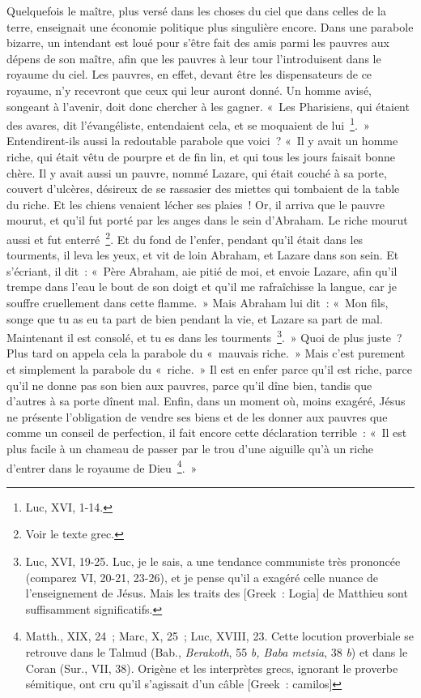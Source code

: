 \documentclass[french,twoside]{book} %
\begin{document}
Quelquefois le maître, plus versé dans les choses du ciel que dans celles de la terre, enseignait une économie politique plus singulière encore. Dans une parabole bizarre, un intendant est loué pour s’être fait des amis parmi les pauvres aux dépens de son maître, afin que les pauvres à leur tour l’introduisent dans le royaume du ciel. Les pauvres, en effet, devant être les dispensateurs de ce royaume, n’y recevront que ceux qui leur auront donné. Un homme avisé, songeant à l’avenir, doit donc chercher à les gagner. « Les Pharisiens, qui étaient des avares, dit l’évangéliste, entendaient cela, et se moquaient de lui \footnote{Luc, XVI, 1-14.}. » Entendirent-ils aussi la redoutable parabole que voici ? « Il y avait un homme riche, qui était vêtu de pourpre et de fin lin, et qui tous les jours faisait bonne chère. Il y avait aussi un pauvre, nommé Lazare, qui était couché à sa porte, couvert d’ulcères, désireux de se rassasier des miettes qui tombaient de la table du riche. Et les chiens venaient lécher ses plaies ! Or, il arriva que le pauvre mourut, et qu’il fut porté par les anges dans le sein d’Abraham. Le riche mourut aussi et fut enterré \footnote{Voir le texte grec.}. Et du fond de l’enfer, pendant qu’il était dans les tourments, il leva les yeux, et vit de loin Abraham, et Lazare dans son sein. Et s’écriant, il dit : « Père Abraham, aie pitié de moi, et envoie Lazare, afin qu’il trempe dans l’eau le bout de son doigt et qu’il me rafraîchisse la langue, car je souffre cruellement dans cette flamme. » Mais Abraham lui dit : « Mon fils, songe que tu as eu ta part de bien pendant la vie, et Lazare sa part de mal. Maintenant il est consolé, et tu es dans les tourments \footnote{ Luc, XVI, 19-25. Luc, je le sais, a une tendance communiste très prononcée (comparez VI, 20-21, 23-26), et je pense qu’il a exagéré celle nuance de l’enseignement de Jésus. Mais les traits des [Greek : Logia] de Matthieu sont suffisamment significatifs.}. » Quoi de plus juste ? Plus tard on appela cela la parabole du « mauvais riche. » Mais c’est purement et simplement la parabole du « riche. » Il est en enfer parce qu’il est riche, parce qu’il ne donne pas son bien aux pauvres, parce qu’il dîne bien, tandis que d’autres à sa porte dînent mal. Enfin, dans un moment où, moins exagéré, Jésus ne présente l’obligation de vendre ses biens et de les donner aux pauvres que comme un conseil de perfection, il fait encore cette déclaration terrible : « Il est plus facile à un chameau de passer par le trou d’une aiguille qu’à un riche d’entrer dans le royaume de Dieu \footnote{ Matth., XIX, 24 ; Marc, X, 25 ; Luc, XVIII, 23. Cette locution proverbiale se retrouve dans le Talmud (Bab., {\itshape Berakoth}, 55 {\itshape b, Baba metsia}, 38 {\itshape b}) et dans le Coran (Sur., VII, 38). Origène et les interprètes grecs, ignorant le proverbe sémitique, ont cru qu’il s’agissait d’un câble [Greek : camilos]}. »\par
\end{document}

